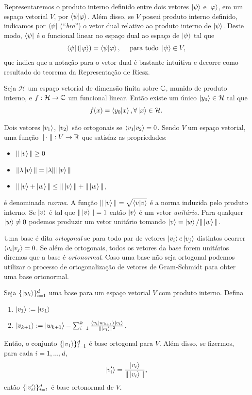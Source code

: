 Representaremos o produto interno definido entre dois vetores $\ket{\psi}$ e $\ket{\varphi}$, em um espaço vetorial $V$, por $\braket{\psi|\varphi}$. Além disso, se $V$ possui produto interno definido, indicamos por $\bra{\psi}$ (``\textit{bra}'') o vetor dual relativo ao produto interno de $\ket{\psi}$. Deste modo, $\bra{\psi}$ é o funcional linear no espaço dual ao espaço de $\ket{\psi}$ tal que
%
\begin{equation}\label{eq:riesz}
	\bra{\psi}(\ket{\varphi}) = \braket{\psi|\varphi}, \quad \text{ para todo } \ket{\psi}\in V,
\end{equation}
%
que indica que a notação para o vetor dual é bastante intuitiva e decorre como resultado do teorema da Representação de Riesz.
%
\begin{theorem}
	Seja $\mathcal{H}$ um espaço vetorial de dimensão finita sobre $\mathbb{C}$, munido de produto interno, e $f: \mathcal{H} \to \mathbb{C}$ um funcional linear. Então existe um único $\ket{y_0}\in \mathcal{H}$ tal que
	$$
	f(x) = \braket{y_0|x}, \forall \ket{x} \in \mathcal{H}.
	$$
\end{theorem}
%
\noindent
Dois vetores $\ket{v_1}$, $\ket{v_2}$ são ortogonais se $\braket{v_1|v_2} = 0$. Sendo $V$ um espaço vetorial, uma função $\|\cdot\|: V\to \mathbb{R}$ que satisfaz as propriedades:
\begin{itemize}
	\item $\|\ket{v}\|\geq 0$
	\item $\|\lambda \ket{v}\| = |\lambda|\|\ket{v}\|$
	\item $\|\ket{v}+\ket{w}\| \leq \|\ket{v}\| + \|\ket{w}\|$,
\end{itemize}
é denominada \emph{norma}. A função $\|\ket{v}\| = \sqrt{\braket{v|v}}$ é a norma induzida pelo produto interno. Se $\ket{v}$ é tal que $\|\ket{v}\|=1$ então $\ket{v}$ é um vetor \emph{unitário}. Para qualquer $\ket{w}\neq 0$ podemos produzir um vetor unitário tomando $\ket{v} = \ket{w}/\|\ket{w}\|$.

Uma base é dita \emph{ortogonal} se para todo par de vetores $\ket{v_i} e \ket{v_j}$ distintos ocorrer $\braket{v_i|v_j} = 0$. Se além de ortogonais, todos os vetores da base forem unitários diremos que a base é \emph{ortonormal}. Caso uma base não seja ortogonal podemos utilizar o processo de ortogonalização de vetores de Gram-Schmidt para obter uma base ortonormal.

\begin{theorem}
	Seja $\{\ket{w_i}\}_{i=1}^d$ uma base para um espaço vetorial $V$ com produto interno. Defina

	\begin{enumerate}
		\item $\ket{v_1} := \ket{w_1}$
		\item $\ket{v_{k+1}} := \ket{w_{k+1}}-\sum_{i=1}^k\frac{\braket{v_i|w_{k+1}}\ket{v_i}}{\|\ket{v_i}\|^2}$.
	\end{enumerate}
	Então, o conjunto $\{\ket{v_1}\}_{i=1}^d$ é base ortogonal para $V$. Além disso, se fizermos, para cada $i=1, \dotso, d$,
$$
	\ket{v'_i} = \frac{\ket{v_i}}{\|\ket{v_i}\|},
$$
então $\{\ket{v'_i}\}_{i=1}^d$ é base ortonormal de $V$.
\end{theorem}

